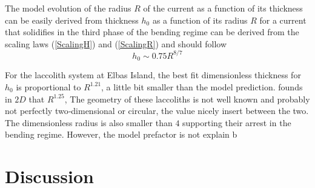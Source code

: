 The model evolution of the radius $R$  of the current as a function of
its thickness can be easily derived from thickness $h_0$ as a function
of its radius $R$ for a current  that solidifies in the third phase of
the   bending  regime   can   be  derived   from   the  scaling   laws
(\ref{ScalingH}) and (\ref{ScalingR}) and should follow
\begin{equation}
  h_0 \sim 0.75 R^{8/7}\label{Hr}
\end{equation}

For the laccolith  system at Elbas Island, the  best fit dimensionless
thickness  for  $h_0$ is  proportional  to  $R^{1.21}$, a  little  bit
smaller than  the model  prediction. \citep{Michaut:2011kg}  founds in
$2D$ that  $R^{1.25}$, The  geometry of these  laccoliths is  not well
known  and probably  not  perfectly two‐dimensional  or circular,  the
value nicely insert between the  two. The dimensionless radius is also
smaller   than   $4$   supporting   their  arrest   in   the   bending
regime. However, the model prefactor is not explain b

\section{Discussion}
\label{C2-sec:discussion}

